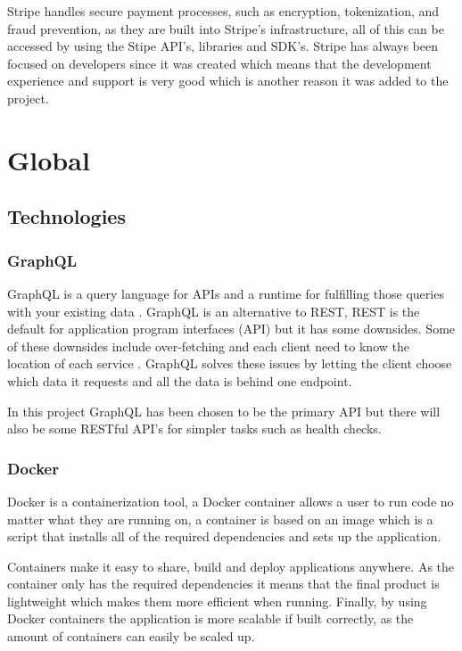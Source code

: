 \documentclass[]{project_report}
\begin{document}
Stripe handles secure payment processes, such as encryption, tokenization, and fraud prevention, as they are built into Stripe’s infrastructure, all of this can be accessed by using the Stipe API's, libraries and SDK's. Stripe has always been focused on developers since it was created which means that the development experience and support is very good which is another reason it was added to the project.


\section{Global}
\subsection{Technologies}
\subsubsection{GraphQL}

GraphQL is a query language for APIs and a runtime for fulfilling those queries with your existing data \cite{graphql}. GraphQL is an alternative to REST, REST is the default for application program interfaces (API) but it has some downsides. Some of these downsides include over-fetching and each client need to know the location of each service \cite{why_graphql}. GraphQL solves these issues by letting the client choose which data it requests and all the data is behind one endpoint. 

In this project GraphQL has been chosen to be the primary API but there will also be some RESTful API's for simpler tasks such as health checks.

\subsubsection{Docker}

Docker is a containerization tool, a Docker container allows a user to run code no matter what they are running on, a container is based on an image which is a script that installs all of the required dependencies and sets up the application. 

Containers make it easy to share, build and deploy applications anywhere. As the container only has the required dependencies it means that the final product is lightweight which makes them more efficient when running. Finally, by using Docker containers the application is more scalable if built correctly, as the amount of containers can easily be scaled up. 
\end{document}
